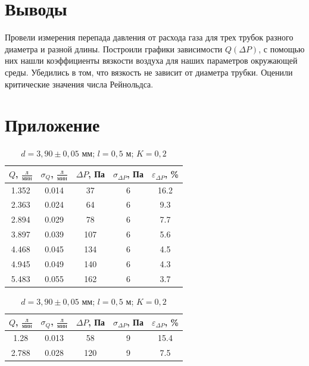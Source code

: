 \documentclass[a4paper,12pt]{article}
\begin{document}
\section{Выводы}

 Провели измерения перепада давления от расхода газа для трех трубок разного диаметра и разной длины. Построили графики зависимости $Q(\Delta P)$, с помощью них нашли коэффициенты вязкости воздуха для наших параметров окружающей среды. Убедились в том, что вязкость не зависит от диаметра трубки. Оценили критические значения числа Рейнольдса. 

    \section{Приложение}

\begin{table}[h!]
\centering
\begin{minipage}{0.48\textwidth}
\centering
    \begin{tabular}{|c|c|c|c|c|}
        \hline
        $Q$, $\frac{\text{л}}{\text{мин}}$ & $\sigma_Q$, $\frac{\text{л}}{\text{мин}}$  & $\Delta P$, Па & $\sigma_{\Delta P}$, Па & $\varepsilon_{\Delta P}$, \% \\
        \hline
        1.352 & 0.014 & 37 & 6 & 16.2 \\ \hline
        2.363 & 0.024 & 64 & 6 & 9.3 \\ \hline
        2.894 & 0.029 & 78 & 6 & 7.7 \\ \hline
        3.897 & 0.039 & 107 & 6 & 5.6 \\ \hline
        4.468 & 0.045 & 134 & 6 & 4.5 \\ \hline
        4.945 & 0.049 & 140 & 6 & 4.3 \\ \hline
        5.483 & 0.055 & 162 & 6 & 3.7 \\ \hline
    \end{tabular}
    \caption{$d=3,90 \pm 0,05$ мм; $l = 0,5$ м; $K = 0,2$}
\end{minipage}
\hfill
\begin{minipage}{0.48\textwidth}
\centering
    \begin{tabular}{|c|c|c|c|c|}
        \hline
        $Q$, $\frac{\text{л}}{\text{мин}}$ & $\sigma_Q$, $\frac{\text{л}}{\text{мин}}$  & $\Delta P$, Па & $\sigma_{\Delta P}$, Па & $\varepsilon_{\Delta P}$, \% \\
        \hline
        1.28 & 0.013 & 58 & 9 & 15.4 \\ \hline
        2.788 & 0.028 & 120 & 9 & 7.5 \\ \hline

\end{tabular}
\end{minipage}
\end{table}
\end{document}
